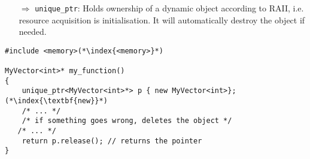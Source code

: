 \documentclass[10pt]{article}
\begin{document}
\begin{enumerate}
\item[$\Rightarrow$] \texttt{unique\_ptr}:
Holds ownership of a dynamic object according to RAII, i.e. resource acquisition is initialisation. It will 
automatically destroy the object if needed.
\end{enumerate}
\begin{lstlisting}
#include <memory>(*\index{<memory>}*)

MyVector<int>* my_function()
{
    unique_ptr<MyVector<int>*> p { new MyVector<int>};(*\index{\textbf{new}}*)
    /* ... */
    /* if something goes wrong, deletes the object */
   /* ... */   
    return p.release(); // returns the pointer
}
\end{lstlisting}
%
%
\end{document}
